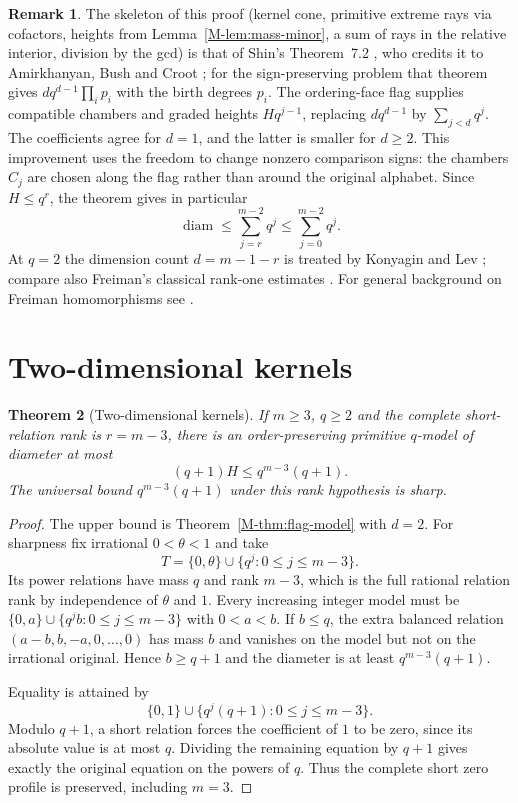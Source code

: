 \documentclass[11pt,reqno]{amsart}
\theoremstyle{plain}
\newtheorem{theorem}{Theorem}[section]
\theoremstyle{definition}
\newtheorem{remark}[theorem]{Remark}
\theoremstyle{plain}
\newcommand{\diam}{\operatorname{diam}}
\theoremstyle{plain}
\theoremstyle{plain}
\theoremstyle{plain}
\theoremstyle{plain}
\theoremstyle{plain}
\theoremstyle{definition}
\theoremstyle{definition}
\theoremstyle{definition}
\theoremstyle{plain}
\begin{document}
\begin{remark}\label{M-rem:flag-attribution}
The skeleton of this proof (kernel cone, primitive extreme rays via
cofactors, heights from Lemma~\ref{M-lem:mass-minor}, a sum of rays in the
relative interior, division by the gcd) is that of Shin's Theorem~7.2
\cite{M-Shin26}, who credits it to Amirkhanyan, Bush and Croot \cite{M-ABC18};
for the sign-preserving problem that theorem gives $dq^{d-1}\prod_ip_i$ with
the birth degrees $p_i$. The ordering-face flag supplies compatible chambers and graded heights
$Hq^{j-1}$, replacing $dq^{d-1}$ by $\sum_{j<d}q^j$. The coefficients agree
for $d=1$, and the latter is smaller for $d\ge2$. This improvement uses
the freedom to change nonzero comparison signs: the chambers $C_j$ are
chosen along the flag rather than around the original alphabet. Since $H\le q^r$,
the theorem gives in particular
\begin{equation}\label{M-eq:rank-sensitive-sum}
 \diam\le\sum_{j=r}^{m-2}q^j\le\sum_{j=0}^{m-2}q^j .
\end{equation}
At $q=2$ the dimension count $d=m-1-r$ is treated by
Konyagin and Lev \cite[Theorem~4]{M-KL00}; compare also Freiman's classical
rank-one estimates \cite{M-Fre73}. For general background on Freiman
homomorphisms see \cite{M-Gry13}.
\end{remark}

\section{Two-dimensional kernels}\label{M-sec:corank}

\begin{theorem}[Two-dimensional kernels]\label{M-thmE}\label{M-thm:corank-model}
If $m\ge3$, $q\ge2$ and the complete short-relation rank is $r=m-3$,
there is an order-preserving primitive $q$-model of diameter at most
\[
 (q+1)H\le q^{m-3}(q+1).
\]
The universal bound $q^{m-3}(q+1)$ under this rank hypothesis is sharp.
\end{theorem}
\begin{proof}
The upper bound is Theorem~\ref{M-thm:flag-model} with $d=2$. For sharpness
fix irrational $0<\theta<1$ and take
\[
 T=\{0,\theta\}\cup\{q^j:0\le j\le m-3\}.
\]
Its power relations have mass $q$ and rank $m-3$, which is the full rational
relation rank by independence of $\theta$ and $1$. Every increasing integer
model must be $\{0,a\}\cup\{q^jb:0\le j\le m-3\}$ with $0<a<b$.
If $b\le q$, the extra balanced relation $(a-b,b,-a,0,\ldots,0)$ has
mass $b$ and vanishes on the model but not on the irrational original.
Hence $b\ge q+1$ and the diameter is at least $q^{m-3}(q+1)$.

Equality is attained by
\[
 \{0,1\}\cup\{q^j(q+1):0\le j\le m-3\}.
\]
Modulo $q+1$, a short relation forces the coefficient of $1$ to be zero,
since its absolute value is at most $q$. Dividing the remaining equation
by $q+1$ gives exactly the original equation on the powers of $q$. Thus
the complete short zero profile is preserved, including $m=3$.
\end{proof}
\end{document}

